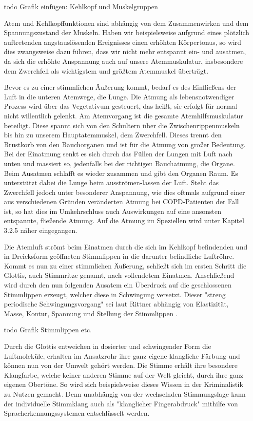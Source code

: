 todo Grafik einfügen: Kehlkopf und Muskelgruppen

Atem und Kehlkopffunktionen sind abhängig von dem Zusammenwirken und dem Spannungszustand der Muskeln. Haben wir beispielsweise aufgrund eines plötzlich auftretenden angstauslösenden Ereignisses einen erhöhten Körpertonus, so wird dies zwangsweise dazu führen, dass wir nicht mehr entspannt ein- und ausatmen, da sich die erhöhte Anspannung auch auf unsere Atemmuskulatur, insbesondere dem Zwerchfell als wichtigstem und größtem Atemmuskel überträgt. 

Bevor es zu einer stimmlichen Äußerung kommt, bedarf es des Einfließens der Luft in die unteren Atemwege, die Lunge. Die Atmung als lebensnotwendiger Prozess wird über das Vegetativum gesteuert, das heißt, sie erfolgt für normal nicht willentlich gelenkt. Am Atemvorgang ist die gesamte Atemhilfsmuskulatur beteiligt. Diese spannt sich von den Schultern über die Zwischenrippenmuskeln bis hin zu unserem Hauptatemmuskel, dem Zwerchfell. Dieses trennt den Brustkorb von den Bauchorganen und ist für die Atmung von großer Bedeutung. Bei der Einatmung senkt es sich durch das Füllen der Lungen mit Luft nach unten und massiert so, jedenfalls bei der richtigen Bauchatmung, die Organe. Beim Ausatmen schlafft es wieder zusammen und gibt den Organen Raum. Es unterstützt dabei die Lunge beim ausströmen-lassen der Luft. Steht das Zwerchfell jedoch unter besonderer Anspannung, wie dies oftmals aufgrund einer aus verschiedenen Gründen veränderten Atmung bei COPD-Patienten der Fall ist, so hat dies im Umkehrschluss auch Auswirkungen auf eine ansonsten entspannte, fließende Atmung. Auf die Atmung im Speziellen wird unter Kapitel 3.2.5 näher eingegangen. 

Die Atemluft strömt beim Einatmen durch die sich im Kehlkopf befindenden und in Dreicksform geöffneten Stimmlippen in die darunter befindliche Luftröhre. Kommt es nun zu einer stimmlichen Äußerung, schließt sich im ersten Schritt die Glottis, auch Stimmritze genannt, nach vollendetem Einatmen. Anschließend wird durch den nun folgenden Ausatem ein Überdruck auf die geschlossenen Stimmlippen erzeugt, welcher diese in Schwingung versetzt. Dieser "streng periodische Schwingungsvorgang" \autocite[481]{rittner2009a} sei laut Rittner abhängig von Elastizität, Masse, Kontur, Spannung und Stellung der Stimmlippen \autocite[vgl.][481]{rittner2009a}.

todo Grafik Stimmlippen etc.

Durch die Glottis entweichen in dosierter und schwingender Form die Luftmoleküle, erhalten im Ansatzrohr ihre ganz eigene klangliche Färbung und können nun von der Umwelt gehört werden. Die Stimme erhält ihre besondere Klangfarbe, welche keiner anderen Stimme auf der Welt gleicht, durch ihre ganz eigenen Obertöne. So wird sich beispielsweise dieses Wissen in der Kriminalistik zu Nutzen gemacht. Denn unabhängig von der wechselnden Stimmungslage kann der individuelle Stimmklang auch als "klanglicher Fingerabdruck" \autocite[482]{rittner2009a} mithilfe von Spracherkennungssystemen entschlüsselt werden. 

